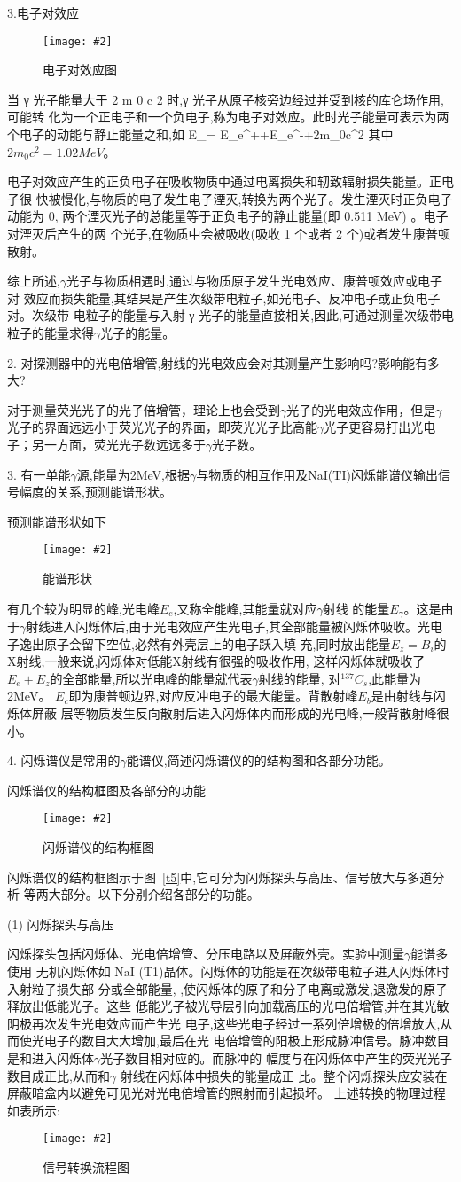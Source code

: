 \documentclass[11pt,a4paper]{ctexart}
\newcommand{\cpic}[2]{
\begin{center}
\texttt{[image: \#2]}
\end{center}
}
\newcommand{\cpicn}[3]
{
\begin{figure}[H]
\cpic{#1}{#2}
\caption{\color{red}#3\label{#2}}
\end{figure}
}
\begin{document}
3.电子对效应
\cpicn{0.4}{t3.png}{电子对效应图}
当 γ 光子能量大于 2 m 0 c 2 时,γ 光子从原子核旁边经过并受到核的库仑场作用,可能转
化为一个正电子和一个负电子,称为电子对效应。此时光子能量可表示为两个电子的动能与静止能量之和,如
\beq
E_\gamma = E_e^{+}+E_e^{-}+2m_0c^2
\eeq
其中$2m_0c^2 = 1.02MeV$。

电子对效应产生的正负电子在吸收物质中通过电离损失和轫致辐射损失能量。正电子很
快被慢化,与物质的电子发生电子湮灭,转换为两个光子。发生湮灭时正负电子动能为 0,
两个湮灭光子的总能量等于正负电子的静止能量(即 0.511 MeV)
。电子对湮灭后产生的两
个光子,在物质中会被吸收(吸收 1 个或者 2 个)或者发生康普顿散射。

综上所述,$\gamma$光子与物质相遇时,通过与物质原子发生光电效应、康普顿效应或电子对
效应而损失能量,其结果是产生次级带电粒子,如光电子、反冲电子或正负电子对。次级带
电粒子的能量与入射 γ 光子的能量直接相关,因此,可通过测量次级带电粒子的能量求得$\gamma$光子的能量。

2. 对探测器中的光电倍增管,射线的光电效应会对其测量产生影响吗?影响能有多大?

对于测量荧光光子的光子倍增管，理论上也会受到$\gamma$光子的光电效应作用，但是$\gamma$光子的界面远远小于荧光光子的界面，即荧光光子比高能$\gamma$光子更容易打出光电子；另一方面，荧光光子数远远多于$\gamma$光子数。

3. 有一单能$\gamma$源,能量为2MeV,根据$\gamma$与物质的相互作用及NaI(TI)闪烁能谱仪输出信号幅度的关系,预测能谱形状。

预测能谱形状如下
\cpicn{0.5}{7-4.png}{能谱形状}
有几个较为明显的峰,光电峰$E_e$,又称全能峰,其能量就对应$\gamma$射线
的能量$E_\gamma$。这是由于$\gamma$射线进入闪烁体后,由于光电效应产生光电子,其全部能量被闪烁体吸收。光电子逸出原子会留下空位,必然有外壳层上的电子跃入填
充,同时放出能量$E_z = B_i$的X射线,一般来说,闪烁体对低能X射线有很强的吸收作用,
这样闪烁体就吸收了$E_e+E_z$的全部能量,所以光电峰的能量就代表$\gamma$射线的能量,
对$^{137}C_s$,此能量为2MeV。
$E_c$即为康普顿边界,对应反冲电子的最大能量。背散射峰$E_b$是由射线与闪烁体屏蔽
层等物质发生反向散射后进入闪烁体内而形成的光电峰,一般背散射峰很小。

4. 闪烁谱仪是常用的$\gamma$能谱仪,简述闪烁谱仪的的结构图和各部分功能。

闪烁谱仪的结构框图及各部分的功能
\cpicn{0.4}{t5.png}{闪烁谱仪的结构框图}
闪烁谱仪的结构框图示于图~\ref{t5}中,它可分为闪烁探头与高压、信号放大与多道分析
等两大部分。以下分别介绍各部分的功能。

(1) 闪烁探头与高压

闪烁探头包括闪烁体、光电倍增管、分压电路以及屏蔽外壳。实验中测量$\gamma$能谱多使用
无机闪烁体如 NaI (T1)晶体。闪烁体的功能是在次级带电粒子进入闪烁体时入射粒子损失部
分或全部能量,
,使闪烁体的原子和分子电离或激发,退激发的原子释放出低能光子。这些
低能光子被光导层引向加载高压的光电倍增管,并在其光敏阴极再次发生光电效应而产生光
电子,这些光电子经过一系列倍增极的倍增放大,从而使光电子的数目大大增加,最后在光
电倍增管的阳极上形成脉冲信号。脉冲数目是和进入闪烁体$\gamma$光子数目相对应的。而脉冲的
幅度与在闪烁体中产生的荧光光子数目成正比,从而和$\gamma$ 射线在闪烁体中损失的能量成正
比。整个闪烁探头应安装在屏蔽暗盒内以避免可见光对光电倍增管的照射而引起损坏。
上述转换的物理过程如表所示:
\cpicn{0.6}{t6.png}{信号转换流程图}
\end{document}
